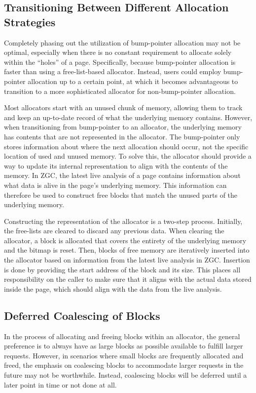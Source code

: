 \subsection{Transitioning Between Different Allocation Strategies}

Completely phasing out the utilization of bump-pointer allocation may not be optimal, especially when there is no constant requirement to allocate solely within the ``holes'' of a page. Specifically, because bump-pointer allocation is faster than using a free-list-based allocator. Instead, users could employ bump-pointer allocation up to a certain point, at which it becomes advantageous to transition to a more sophisticated allocator for non-bump-pointer allocation.

Most allocators start with an unused chunk of memory, allowing them to track and keep an up-to-date record of what the underlying memory contains. However, when transitioning from bump-pointer to an allocator, the underlying memory has contents that are not represented in the allocator. The bump-pointer only stores information about where the next allocation should occur, not the specific location of used and unused memory. To solve this, the allocator should provide a way to update its internal representation to align with the contents of the memory. In ZGC, the latest live analysis of a page contains information about what data is alive in the page's underlying memory. This information can therefore be used to construct free blocks that match the unused parts of the underlying memory.

Constructing the representation of the allocator is a two-step process. Initially, the free-lists are cleared to discard any previous data. When clearing the allocator, a block is allocated that covers the entirety of the underlying memory and the bitmap is reset. Then, blocks of free memory are iteratively inserted into the allocator based on information from the latest live analysis in ZGC. Insertion is done by providing the start address of the block and its size. This places all responsibility on the caller to make sure that it aligns with the actual data stored inside the page, which should align with the data from the live analysis.

\subsection{Deferred Coalescing of Blocks}

In the process of allocating and freeing blocks within an allocator, the general preference is to always have as large blocks as possible available to fulfill larger requests. However, in scenarios where small blocks are frequently allocated and freed, the emphasis on coalescing blocks to accommodate larger requests in the future may not be worthwhile. Instead, coalescing blocks will be deferred until a later point in time or not done at all.

